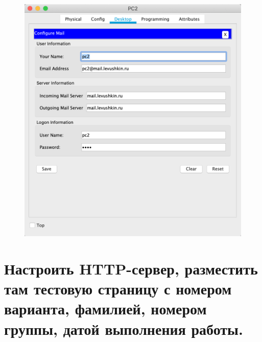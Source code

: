 \documentclass[a4paper,12pt]{article}
\begin{document}
\begin{figure}[h!]
\begin{minipage}[b]{0.32\textwidth}
		\end{minipage}
		\begin{minipage}[b]{0.32\textwidth}
			\includegraphics[width=\textwidth]{10.3.png}
		\end{minipage}
		\label{ris:10}
	\end{figure}

	\newpage
	
	\section{Настроить HTTP-сервер, разместить там тестовую страницу с номером варианта, фамилией, номером группы, датой выполнения работы.}
	
\end{document}
